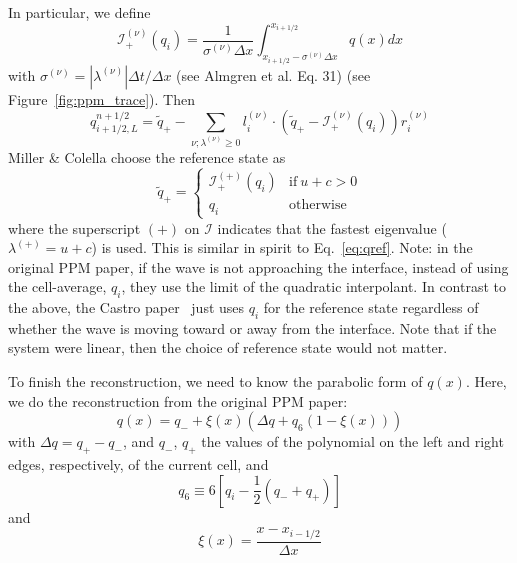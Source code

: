 \documentclass[11pt]{article}
\newcommand{\evp}{{(+)}}
\begin{document}
In particular, we define 
\begin{equation}
\mathcal{I}_+^{(\nu)}(q_i) = \frac{1}{\sigma^{(\nu)} \Delta x} \int _{x_{i+1/2} - \sigma^{(\nu)} \Delta x}^{x_{i+1/2}} q(x) dx
\end{equation} 
with $\sigma^{(\nu)} = |\lambda^{(\nu)}|\Delta t / \Delta x$ (see Almgren et
al. Eq. 31)  (see Figure~\ref{fig:ppm_trace}).  Then
\begin{equation}
q_{i+1/2,L}^{n+1/2} = \tilde{q}_+ -
   \sum_{\nu;\lambda^{(\nu)}\ge 0} l_i^{(\nu)} \cdot \left (
        \tilde{q}_+ - \mathcal{I}_+^{(\nu)}(q_i)
       \right ) r_i^{(\nu)}  \label{eq:ppmtrace}
\end{equation}
Miller \& Colella choose the reference state as
\begin{equation}
\tilde{q}_+ = \left \{ \begin{array}{cc} 
       \mathcal{I}_+^{(+)}(q_i) & \mathrm{if~} u + c > 0 \\
       q_i                    & \mathrm{otherwise}
\end{array}
\right .
\end{equation}
where the superscript $(+)$ on $\mathcal{I}$ indicates that the
fastest eigenvalue ($\lambda^\evp = u + c$) is used.  This is similar in
spirit to Eq.~\ref{eq:qref}.  Note: in the original PPM paper, if the
wave is not approaching the interface, instead of using the
cell-average, $q_i$, they use the limit of the quadratic interpolant.
In contrast to the above, the Castro paper~\cite{almgren:2010} just
uses $q_i$ for the reference state regardless of whether the wave is
moving toward or away from the interface.  Note that if the system
were linear, then the choice of reference state would not matter.

To finish the reconstruction, we need to know the parabolic form
of $q(x)$.  Here, we do the reconstruction from the original PPM
paper:
\begin{equation}
q(x) = q_{-} + \xi(x) \left ( \Delta q + q_6 (1 - \xi(x) ) \right )
\end{equation}
with $\Delta q = q_+ - q_-$, and $q_-$, $q_+$ the values of the polynomial
on the left and right edges, respectively, of the current cell, and 
\begin{equation}
q_6 \equiv 6 \left [ q_i - \frac{1}{2} (q_- + q_+) \right ]
\end{equation}
and
\begin{equation}
\xi(x) = \frac{x - x_{i-1/2}}{\Delta x}
\end{equation}
\end{document}
